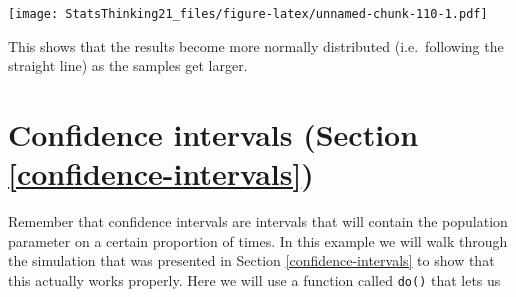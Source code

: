 \documentclass[12pt,]{book}
\newenvironment{Shaded}{\begin{snugshade}}{\end{snugshade}}
\newcommand{\CommentTok}[1]{\textcolor[rgb]{0.56,0.35,0.01}{\textit{#1}}}
\newcommand{\ControlFlowTok}[1]{\textcolor[rgb]{0.13,0.29,0.53}{\textbf{#1}}}
\newcommand{\DataTypeTok}[1]{\textcolor[rgb]{0.13,0.29,0.53}{#1}}
\newcommand{\DecValTok}[1]{\textcolor[rgb]{0.00,0.00,0.81}{#1}}
\newcommand{\KeywordTok}[1]{\textcolor[rgb]{0.13,0.29,0.53}{\textbf{#1}}}
\newcommand{\NormalTok}[1]{#1}
\newcommand{\OperatorTok}[1]{\textcolor[rgb]{0.81,0.36,0.00}{\textbf{#1}}}
\newcommand{\OtherTok}[1]{\textcolor[rgb]{0.56,0.35,0.01}{#1}}
\newcommand{\StringTok}[1]{\textcolor[rgb]{0.31,0.60,0.02}{#1}}
\begin{document}
\begin{Shaded}
\end{Shaded}

\texttt{[image: StatsThinking21\_files/figure-latex/unnamed-chunk-110-1.pdf]}

This shows that the results become more normally distributed (i.e.~following the straight line) as the samples get larger.

\hypertarget{confidence-intervals-section-refconfidence-intervals}{%
\section{Confidence intervals (Section \ref{confidence-intervals})}\label{confidence-intervals-section-refconfidence-intervals}}

Remember that confidence intervals are intervals that will contain the population parameter on a certain proportion of times. In this example we will walk through the simulation that was presented in Section \ref{confidence-intervals} to show that this actually works properly. Here we will use a function called \texttt{do()} that lets us
\end{document}
